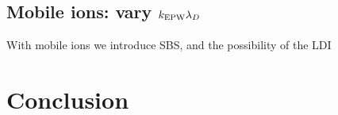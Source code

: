 \subsection{Mobile ions: vary $k_\mathrm{EPW}\lambda_D$}

With mobile ions we introduce SBS, and the possibility of the LDI

\section{Conclusion}



